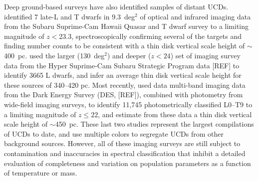 \documentclass[manuscript]{aastex63}
\begin{document}
Deep ground-based surveys have also identified samples of distant UCDs.
\citet{2010ApJ...723..184K} identified 7 late-L and T dwarfs in 9.3~deg$^2$ of optical and infrared imaging data from the Subaru Suprime-Cam Hawaii Quasar and T dwarf survey to a limiting magnitude of $z < 23.3$, spectroscopically confirming several of the targets and finding number counts to be consistent with a thin disk vertical scale height of $\sim$400~pc.
\citet{Sorahana2018} used the larger (130~deg$^2$) and deeper ($z < 24$) set of imaging survey data from the Hyper Suprime-Cam Subaru Strategic Program data [REF] to identify 3665 L dwarfs, and infer an average thin disk vertical scale height for these sources of 340--420 pc. 
Most recently, \cite{2019MNRAS.489.5301C} used data multi-band imaging data from the Dark Energy Survey (DES, [REF]), combined with photometry from wide-field imaging surveys, to identify 11,745 photometrically classified L0--T9 to a limiting magnitude of $z\leqslant22$, and estimate from these data a thin disk vertical scale height of $\sim$450~pc. 
These last two studies represent the largest compilations of UCDs to date, and use multiple colors to  segregate UCDs from other background sources.
However, all of these imaging surveys are still subject to contamination and inaccuracies in spectral classification that inhibit a detailed evaluation of completeness and variation on population parameters as a function of temperature or mass.
\end{document}
